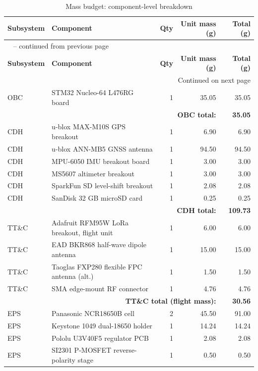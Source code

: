 \small
\begin{longtable}{p{1.6cm}p{6cm}rrr}
\caption{Mass budget: component-level breakdown}
\label{tab:mass-budget} \\
\toprule
\textbf{Subsystem} & \textbf{Component} & \textbf{Qty} & \textbf{Unit mass (g)} & \textbf{Total (g)} \\
\midrule
\endfirsthead
\multicolumn{5}{l}{\tablename\ \thetable{} -- continued from previous page} \\
\toprule
\textbf{Subsystem} & \textbf{Component} & \textbf{Qty} & \textbf{Unit mass (g)} & \textbf{Total (g)} \\
\midrule
\endhead
\midrule
\multicolumn{5}{r}{Continued on next page} \\
\endfoot
\bottomrule
\endlastfoot
OBC & STM32 Nucleo-64 L476RG board & 1 & 35.05 & 35.05 \\
\midrule
\multicolumn{4}{r}{\textbf{OBC total:}} & \textbf{35.05} \\
CDH & u-blox MAX-M10S GPS breakout & 1 & 6.90 & 6.90 \\
CDH & u-blox ANN-MB5 GNSS antenna & 1 & 94.50 & 94.50 \\
CDH & MPU-6050 IMU breakout board & 1 & 3.00 & 3.00 \\
CDH & MS5607 altimeter breakout & 1 & 3.00 & 3.00 \\
CDH & SparkFun SD level-shift breakout & 1 & 2.08 & 2.08 \\
CDH & SanDisk 32 GB microSD card & 1 & 0.25 & 0.25 \\
\midrule
\multicolumn{4}{r}{\textbf{CDH total:}} & \textbf{109.73} \\
TT\&C & Adafruit RFM95W LoRa breakout, flight unit & 1 & 6.00 & 6.00 \\
TT\&C & EAD BKR868 half-wave dipole antenna & 1 & 15.00 & 15.00 \\
TT\&C & Taoglas FXP280 flexible FPC antenna (alt.) & 1 & 1.50 & 1.50 \\
TT\&C & SMA edge-mount RF connector & 1 & 4.76 & 4.76 \\
\midrule
\multicolumn{4}{r}{\textbf{TT\&C total (flight mass):}} & \textbf{30.56} \\
EPS & Panasonic NCR18650B cell & 2 & 45.50 & 91.00 \\
EPS & Keystone 1049 dual-18650 holder & 1 & 14.24 & 14.24 \\
EPS & Pololu U3V40F5 regulator PCB & 1 & 2.08 & 2.08 \\
EPS & SI2301 P-MOSFET reverse-polarity stage & 1 & 0.50 & 0.50 \\

\end{longtable}
